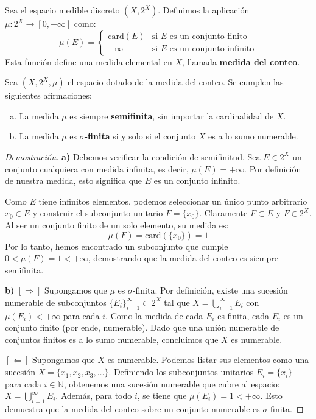 \begin{ejemplo}
	Sea el espacio medible discreto $(X, 2^X)$. Definimos la aplicación $\mu: 2^X \to [0, +\infty]$ como:
	$$ \mu(E) = \begin{cases} \text{card}(E) & \text{si } E \text{ es un conjunto finito} \\ +\infty & \text{si } E \text{ es un conjunto infinito} \end{cases} $$
	Esta función define una medida elemental en $X$, llamada \textbf{medida del conteo}.
\end{ejemplo}

\begin{proposicion}
	Sea $(X, 2^X, \mu)$ el espacio dotado de la medida del conteo. Se cumplen las siguientes afirmaciones:
	\begin{enumerate}[a)]
		\item La medida $\mu$ es siempre \textbf{semifinita}, sin importar la cardinalidad de $X$.
		\item La medida $\mu$ es \textbf{$\sigma$-finita} si y solo si el conjunto $X$ es a lo sumo numerable.
	\end{enumerate}
\end{proposicion}

\begin{proof}[Demostración]
	\textbf{a)} Debemos verificar la condición de semifinitud. Sea $E \in 2^X$ un conjunto cualquiera con medida infinita, es decir, $\mu(E) = +\infty$. Por definición de nuestra medida, esto significa que $E$ es un conjunto infinito. 
	
	Como $E$ tiene infinitos elementos, podemos seleccionar un único punto arbitrario $x_0 \in E$ y construir el subconjunto unitario $F = \{x_0\}$. Claramente $F \subset E$ y $F \in 2^X$. Al ser un conjunto finito de un solo elemento, su medida es:
	$$ \mu(F) = \text{card}(\{x_0\}) = 1 $$
	Por lo tanto, hemos encontrado un subconjunto que cumple $0 < \mu(F) = 1 < +\infty$, demostrando que la medida del conteo es siempre semifinita.
	
	\textbf{b)} $[\Rightarrow]$ Supongamos que $\mu$ es $\sigma$-finita. Por definición, existe una sucesión numerable de subconjuntos $\{E_i\}_{i=1}^\infty \subset 2^X$ tal que $X = \bigcup_{i=1}^\infty E_i$ con $\mu(E_i) < +\infty$ para cada $i$. Como la medida de cada $E_i$ es finita, cada $E_i$ es un conjunto finito (por ende, numerable). Dado que una unión numerable de conjuntos finitos es a lo sumo numerable, concluimos que $X$ es numerable.
	
	$[\Leftarrow]$ Supongamos que $X$ es numerable. Podemos listar sus elementos como una sucesión $X = \{x_1, x_2, x_3, \dots\}$. Definiendo los subconjuntos unitarios $E_i = \{x_i\}$ para cada $i \in \mathbb{N}$, obtenemos una sucesión numerable que cubre al espacio: $X = \bigcup_{i=1}^\infty E_i$. Además, para todo $i$, se tiene que $\mu(E_i) = 1 < +\infty$. Esto demuestra que la medida del conteo sobre un conjunto numerable es $\sigma$-finita.
\end{proof}

